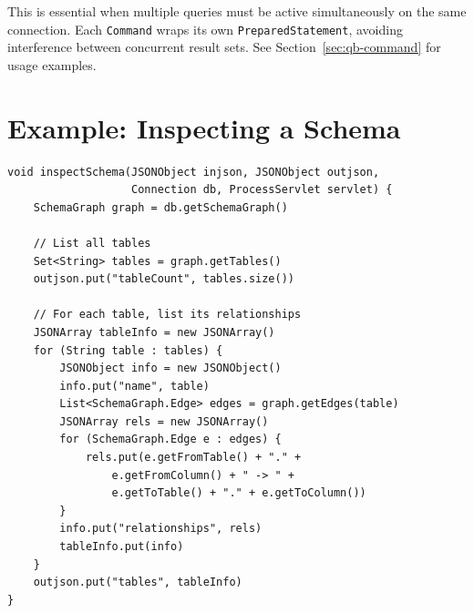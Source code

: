 This is essential when multiple queries must be active simultaneously on the same connection.  Each \texttt{Command} wraps its own \texttt{PreparedStatement}, avoiding interference between concurrent result sets.  See Section~\ref{sec:qb-command} for usage examples.

\section{Example: Inspecting a Schema}
\label{sec:sg-example}

\begin{lstlisting}[style=groovy]
void inspectSchema(JSONObject injson, JSONObject outjson,
                   Connection db, ProcessServlet servlet) {
    SchemaGraph graph = db.getSchemaGraph()

    // List all tables
    Set<String> tables = graph.getTables()
    outjson.put("tableCount", tables.size())

    // For each table, list its relationships
    JSONArray tableInfo = new JSONArray()
    for (String table : tables) {
        JSONObject info = new JSONObject()
        info.put("name", table)
        List<SchemaGraph.Edge> edges = graph.getEdges(table)
        JSONArray rels = new JSONArray()
        for (SchemaGraph.Edge e : edges) {
            rels.put(e.getFromTable() + "." +
                e.getFromColumn() + " -> " +
                e.getToTable() + "." + e.getToColumn())
        }
        info.put("relationships", rels)
        tableInfo.put(info)
    }
    outjson.put("tables", tableInfo)
}
\end{lstlisting}
